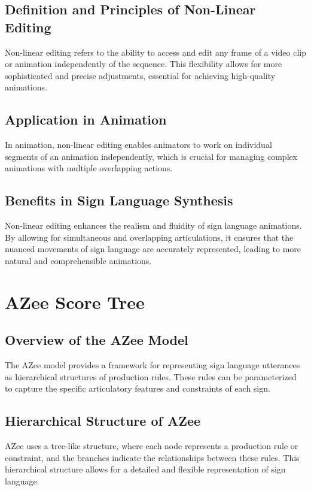 \documentclass[../../main.tex]{subfiles}
\begin{document}
\subsection{Definition and Principles of Non-Linear Editing}
Non-linear editing refers to the ability to access and edit any frame of a video clip or animation independently of the sequence. This flexibility allows for more sophisticated and precise adjustments, essential for achieving high-quality animations.

\subsection{Application in Animation}
In animation, non-linear editing enables animators to work on individual segments of an animation independently, which is crucial for managing complex animations with multiple overlapping actions.

\subsection{Benefits in Sign Language Synthesis}
Non-linear editing enhances the realism and fluidity of sign language animations. By allowing for simultaneous and overlapping articulations, it ensures that the nuanced movements of sign language are accurately represented, leading to more natural and comprehensible animations.

\section{AZee Score Tree}

\subsection{Overview of the AZee Model}
The AZee model provides a framework for representing sign language utterances as hierarchical structures of production rules. These rules can be parameterized to capture the specific articulatory features and constraints of each sign.

\subsection{Hierarchical Structure of AZee}
AZee uses a tree-like structure, where each node represents a production rule or constraint, and the branches indicate the relationships between these rules. This hierarchical structure allows for a detailed and flexible representation of sign language.
\end{document}
